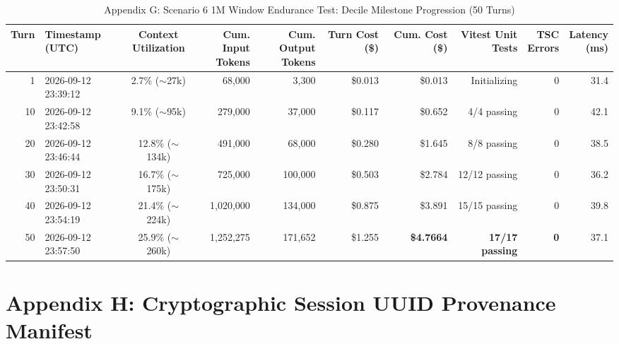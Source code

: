 \documentclass[10pt,twocolumn,a4paper]{article}
\begin{document}
\begin{table}[t]
\caption{Appendix G: Scenario 6 1M Window Endurance Test: Decile Milestone Progression (50 Turns)}
\label{tab:app_scenario6_deciles}
\centering
\scriptsize
\setlength{\tabcolsep}{2.5pt}
\begin{tabular}{@{}rlcrrrrrrr@{}}
\toprule
\textbf{Turn} & \shortstack{\textbf{Timestamp}\\\textbf{(UTC)}} & \shortstack{\textbf{Context}\\\textbf{Utilization}} & \shortstack{\textbf{Cum. Input}\\\textbf{Tokens}} & \shortstack{\textbf{Cum. Output}\\\textbf{Tokens}} & \shortstack{\textbf{Turn Cost}\\\textbf{(\$)}} & \shortstack{\textbf{Cum. Cost}\\\textbf{(\$)}} & \shortstack{\textbf{Vitest Unit}\\\textbf{Tests}} & \shortstack{\textbf{TSC}\\\textbf{Errors}} & \shortstack{\textbf{Latency}\\\textbf{(ms)}} \\
\midrule
1 & 2026-09-12 23:39:12 & 2.7\% ($\sim$27k) & 68,000 & 3,300 & \$0.013 & \$0.013 & Initializing & 0 & 31.4 \\
10 & 2026-09-12 23:42:58 & 9.1\% ($\sim$95k) & 279,000 & 37,000 & \$0.117 & \$0.652 & 4/4 passing & 0 & 42.1 \\
20 & 2026-09-12 23:46:44 & 12.8\% ($\sim$134k) & 491,000 & 68,000 & \$0.280 & \$1.645 & 8/8 passing & 0 & 38.5 \\
30 & 2026-09-12 23:50:31 & 16.7\% ($\sim$175k) & 725,000 & 100,000 & \$0.503 & \$2.784 & 12/12 passing & 0 & 36.2 \\
40 & 2026-09-12 23:54:19 & 21.4\% ($\sim$224k) & 1,020,000 & 134,000 & \$0.875 & \$3.891 & 15/15 passing & 0 & 39.8 \\
50 & 2026-09-12 23:57:50 & 25.9\% ($\sim$260k) & 1,252,275 & 171,652 & \$1.255 & \textbf{\$4.7664} & \textbf{17/17 passing} & \textbf{0} & 37.1 \\
\bottomrule
\end{tabular}
\end{table}

\clearpage
\section*{Appendix H: Cryptographic Session UUID Provenance Manifest}
\end{document}
